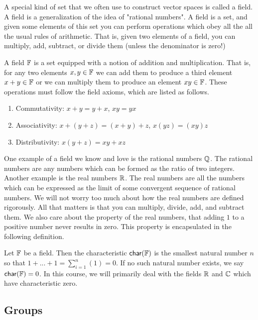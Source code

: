 A special kind of set that we often use to construct vector spaces is called a field. A field is a generalization of the idea of "rational numbers". A field is a set, and given some elements of this set you can perform operations which obey all the all the usual rules of arithmetic. That is, given two elements of a field, you can multiply, add, subtract, or divide them (unless the denominator is zero!)


\begin{defn}[Field]
A field $\operatorname{\mathbb{F}}$ is a set equipped with a notion of addition and multiplication. That is, for any two elements $x,y \in \operatorname{\mathbb{F}}$ we can add them to produce a third element $x+y \in \operatorname{\mathbb{F}}$ or we can multiply them to produce an element $xy \in \operatorname{\mathbb{F}}$. These operations must follow the field axioms, which are listed as follows.
\begin{enumerate}
\item {
Commutativity: $x+y=y+x$, $xy = yx$
}
\item {
Associativity: $x+(y+z) = (x+y)+z$, $x(yz) = (xy)z$
}
\item {
Distributivity: $x(y+z) = xy+xz$
}
\end{enumerate}
\end{defn}

One example of a field we know and love is the rational numbers $\operatorname{\mathbb{Q}}$. The rational numbers are any numbers which can be formed as the ratio of two integers. Another example is the real numbers $\operatorname{\mathbb{R}}$. The real numbers are all the numbers which can be expressed as the limit of some convergent sequence of rational numbers. We will not worry too much about how the real numbers are defined rigorously. All that matters is that you can multiply, divide, add, and subtract them. We also care about the property of the real numbers, that adding $1$ to a positive number never results in zero. This property is encapsulated in the following definition.

\begin{defn}[Characteristic]
Let $\operatorname{\mathbb{F}}$ be a field. Then the characteristic $\textsf{char}(\operatorname{\mathbb{F}})$ is the smallest natural number $n$ so that  $ 1+...+1 = \sum_{i=1}^n (1)= 0$. If no such natural number exists, we say $\textsf{char}(\operatorname{\mathbb{F}}) = 0$. In this course, we will primarily deal with the fields $\operatorname{\mathbb{R}}$ and $\operatorname{\mathbb{C}}$ which have characteristic zero.   
\end{defn}

\subsection{Groups}
